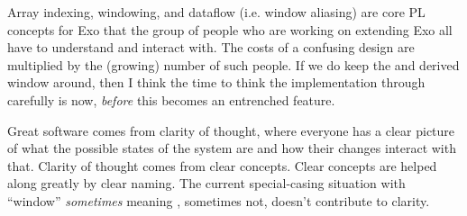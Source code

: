 \filbreak
Array indexing, windowing, and dataflow (i.e. window aliasing) are core PL concepts for Exo that the group of people who are working on extending Exo all have to understand and interact with.
The costs of a confusing design are multiplied by the (growing) number of such people.
If we do keep the  and derived window around, then I think the time to think the implementation through carefully is now, \textit{before} this becomes an entrenched feature.

\filbreak
Great software comes from clarity of thought, where everyone has a clear picture of what the possible states of the system are and how their changes interact with that.
Clarity of thought comes from clear concepts.
Clear concepts are helped along greatly by clear naming.
The current special-casing situation with ``window'' \textit{sometimes} meaning , sometimes not, doesn't contribute to clarity.


